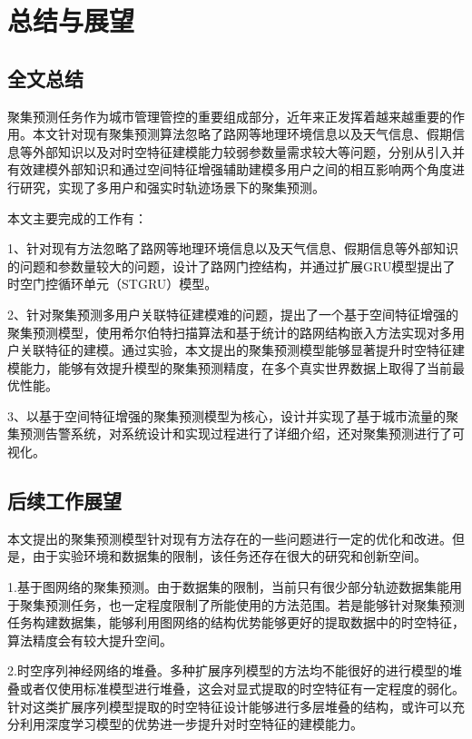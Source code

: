 \documentclass[master]{thesis-uestc}
\begin{document}
\chapter{总结与展望}

\section{全文总结}
聚集预测任务作为城市管理管控的重要组成部分，近年来正发挥着越来越重要的作用。本文针对现有聚集预测算法忽略了路网等地理环境信息以及天气信息、假期信息等外部知识以及对时空特征建模能力较弱参数量需求较大等问题，分别从引入并有效建模外部知识和通过空间特征增强辅助建模多用户之间的相互影响两个角度进行研究，实现了多用户和强实时轨迹场景下的聚集预测。

本文主要完成的工作有：

1、针对现有方法忽略了路网等地理环境信息以及天气信息、假期信息等外部知识的问题和参数量较大的问题，设计了路网门控结构，并通过扩展GRU模型提出了时空门控循环单元（STGRU）模型。

2、针对聚集预测多用户关联特征建模难的问题，提出了一个基于空间特征增强的聚集预测模型，使用希尔伯特扫描算法和基于统计的路网结构嵌入方法实现对多用户关联特征的建模。通过实验，本文提出的聚集预测模型能够显著提升时空特征建模能力，能够有效提升模型的聚集预测精度，在多个真实世界数据上取得了当前最优性能。

3、以基于空间特征增强的聚集预测模型为核心，设计并实现了基于城市流量的聚集预测告警系统，对系统设计和实现过程进行了详细介绍，还对聚集预测进行了可视化。


\section{后续工作展望}
本文提出的聚集预测模型针对现有方法存在的一些问题进行一定的优化和改进。但是，由于实验环境和数据集的限制，该任务还存在很大的研究和创新空间。

1.基于图网络的聚集预测。由于数据集的限制，当前只有很少部分轨迹数据集能用于聚集预测任务，也一定程度限制了所能使用的方法范围。若是能够针对聚集预测任务构建数据集，能够利用图网络的结构优势能够更好的提取数据中的时空特征，算法精度会有较大提升空间。

2.时空序列神经网络的堆叠。多种扩展序列模型的方法均不能很好的进行模型的堆叠或者仅使用标准模型进行堆叠，这会对显式提取的时空特征有一定程度的弱化。针对这类扩展序列模型提取的时空特征设计能够进行多层堆叠的结构，或许可以充分利用深度学习模型的优势进一步提升对时空特征的建模能力。

\thesisappendix



%
% 
%
% 
% 
%

\end{document}
